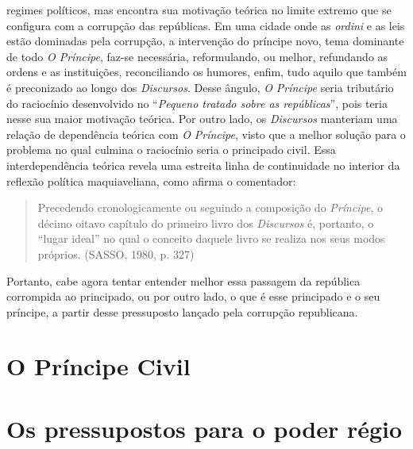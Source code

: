 regimes políticos, mas encontra sua motivação teórica no limite extremo
que se configura com a corrupção das repúblicas. Em uma cidade onde as
\emph{ordini} e as leis estão dominadas pela corrupção, a intervenção do
príncipe novo, tema dominante de todo \emph{O Príncipe}, faz-se
necessária, reformulando, ou melhor, refundando as ordens e as
instituições, reconciliando os humores, enfim, tudo aquilo que também é
preconizado ao longo dos \emph{Discursos}. Desse ângulo, \emph{O}
\emph{Príncipe} seria tributário do raciocínio desenvolvido no
``\emph{Pequeno tratado sobre as repúblicas}'', pois teria nesse sua
maior motivação teórica. Por outro lado, os \emph{Discursos} manteriam
uma relação de dependência teórica com \emph{O} \emph{Príncipe}, visto
que a melhor solução para o problema no qual culmina o raciocínio seria
o principado civil. Essa interdependência teórica revela uma estreita
linha de continuidade no interior da reflexão política maquiaveliana,
como afirma o comentador:

\begin{quote}
Precedendo cronologicamente ou seguindo a composição do \emph{Príncipe},
o décimo oitavo capítulo do primeiro livro dos \emph{Discursos} é,
portanto, o ``lugar ideal'' no qual o conceito daquele livro se realiza
nos seus modos próprios. (SASSO, 1980, p. 327)
\end{quote}

Portanto, cabe agora tentar entender melhor essa passagem da república
corrompida ao principado, ou por outro lado, o que é esse principado e o
seu príncipe, a partir desse pressuposto lançado pela corrupção
republicana.

\section{O Príncipe Civil}

\section{Os pressupostos para o poder régio}

